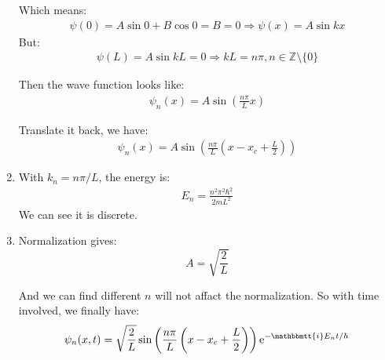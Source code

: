 \documentclass[]{ctexart}
\newcommand{\mi}{\mathbbmtt{i}}
\newcommand{\me}{\mathrm{e}}
\begin{document}
\begin{enumerate}
				Which means:
					\begin{equation*}
						\begin{aligned}
							\psi(0)=A\sin 0+B\cos 0=B=0\Rightarrow \psi(x)=A\sin kx
						\end{aligned}
					\end{equation*}
				But:
					\begin{equation*}
						\begin{aligned}
							\psi(L)=A\sin kL=0\Rightarrow kL=n\pi, n\in \mathbb{Z}\setminus\{0\}
						\end{aligned}
					\end{equation*}
				
				Then the wave function looks like:
					\begin{equation*}
						\begin{aligned}
							\psi_n(x)=A\sin\left( \frac{n\pi}{L}x\right)
						\end{aligned}
					\end{equation*}
				
				Translate it back, we have:
					\begin{equation*}
						\begin{aligned}
							\psi_n(x)=A\sin\left( \frac{n\pi}{L}\left( x-x_c+\frac{L}{2}\right) \right)
						\end{aligned}
					\end{equation*}
				
				\item With $k_n=n\pi/L$, the energy is:
					\begin{equation*}
						\begin{aligned}
							E_n=\frac{n^2\pi^2\hbar^2}{2mL^2}
						\end{aligned}
					\end{equation*}
				We can see it is discrete. 
				
				\item Normalization gives:
					\begin{equation*}
						A=\sqrt{\frac{2}{L}}
					\end{equation*}
				
				And we can find different $n$ will not affact the normalization. So with time involved, we finally have:
					\begin{equation*}
						\begin{aligned}
							\psi_n(x,t)=\sqrt{\frac{2}{L}}\sin\left( \frac{n\pi}{L}\left( x-x_c+\frac{L}{2}\right)\right)\me^{-\mi E_n t/\hbar}
						\end{aligned}
					\end{equation*}
			

\end{enumerate}
\end{document}
